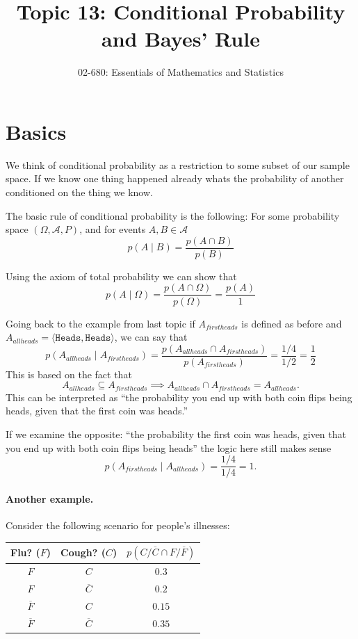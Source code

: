 

\title{Topic 13: Conditional Probability and Bayes' Rule}
\author{02-680: Essentials of Mathematics and Statistics}


\maketitle

\section{Basics}
We think of conditional probability as a restriction to some subset of our sample space. 
If we know one thing happened already whats the probability of another conditioned on the thing we know. 

The basic rule of conditional probability is the following:
For some probability space $(\Omega, \mathcal{A}, P)$, and for events $A,B\in\mathcal{A}$
\[p(A\mid B) = \frac{p(A\cap B)}{p(B)}\]

Using the axiom of total probability we can show that 
\[p(A \mid \Omega) = \frac{p(A \cap \Omega)}{p(\Omega)} = \frac{p(A)}{1}\]

Going back to the example from last topic if $A_{firstheads}$ is defined as before and $A_{allheads}=\langle\texttt{Heads},\texttt{Heads}\rangle$,
we can say that 
\[p(A_{allheads} \mid A_{firstheads}) = \frac{p(A_{allheads} \cap A_{firstheads})}{p(A_{firstheads})} = \frac{1/4}{1/2} = \frac{1}{2}\]
This is based on the fact that \[A_{allheads} \subseteq A_{firstheads} \implies A_{allheads} \cap A_{firstheads} = A_{allheads}.\]
This can be interpreted as ``the probability you end up with both coin flips being heads, given that the first coin was heads.'' 

If we examine the opposite: 
``the probability the first coin was heads, given that you end up with both coin flips being heads'' 
the logic here still makes sense
\[p(A_{firstheads}\mid A_{allheads} ) = \frac{1/4}{1/4} = 1.\]

\paragraph{Another example.}
Consider the following scenario for people's illnesses:
\begin{center}
\begin{tabular}{c|c|c}
\textbf{Flu? ($F$)} & \textbf{Cough? ($C$)} & \textbf{$p(C/\overline{C} \cap F/\overline{F})$}\\
\hline
$F$ & $C$ & $0.3$\\
$F$ & $\overline{C}$ & $0.2$\\
$\overline{F}$ & $C$ & $0.15$\\
$\overline{F}$ & $\overline{C}$ & $0.35$\\
\end{tabular}
\end{center}

